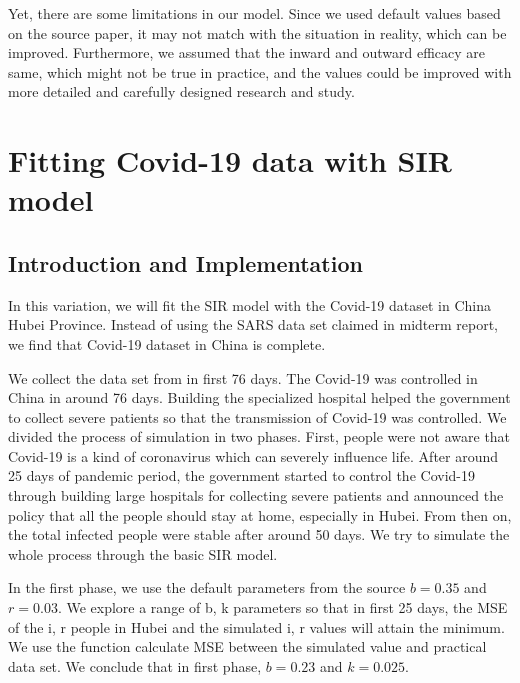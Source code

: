 \documentclass{article}
\begin{document}
Yet, there are some limitations in our model. Since we used default values based on the source paper\cite{Steff2020mask}, it may not match with the situation in reality, which can be improved. Furthermore, we assumed that the inward and outward efficacy are same, which might not be true in practice, and the values could be improved with more detailed and carefully designed research and study. 






\section{Fitting Covid-19 data with SIR model}

\subsection{Introduction and Implementation}

In this variation, we will fit the SIR model with the Covid-19 dataset in China Hubei Province. Instead of using the SARS data set claimed in midterm report, we find that Covid-19 dataset in China is complete. 

We collect the data set from \cite{Johnhopkins} in first 76 days. The Covid-19 was controlled in China in around 76 days. Building the specialized hospital helped the government to collect severe patients so that the transmission of Covid-19 was controlled. We divided the process of simulation in two phases. First, people were not aware that Covid-19 is a kind of coronavirus which can severely influence life. After around 25 days of pandemic period, the government started to control the Covid-19 through building large hospitals for collecting severe patients and announced the policy that all the people should stay at home, especially in Hubei. From then on, the total infected people were stable after around 50 days. We try to simulate the whole process through the basic SIR model. 

In the first phase, we use the default parameters from the source \cite{Cooper2020SIR} $b = 0.35$ and $r = 0.03$. We explore a range of b, k parameters so that in first 25 days, the MSE of the i, r people in Hubei and the simulated i, r values will attain the minimum. We use the function calculate MSE between the simulated value and practical data set. We conclude that in first phase, $b = 0.23$ and $k = 0.025$.
\end{document}
